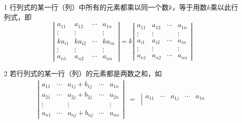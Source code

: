 \begin{xingzhi}[线性性质]
  \begin{itemize}
  \item[1] 行列式的某一行（列）中所有的元素都乘以同一个数$k$，等于用数$k$乘以此行列式，即
    \begin{equation}\label{xz3-1}
      \left|
        \begin{array}{ccccc}
          a_{11}  & a_{12} & \cdots & a_{1n} \\
          \vdots & \vdots     &        & \vdots \\
          ka_{i1}  & ka_{i2} & \cdots & ka_{in} \\
          \vdots & \vdots     &        & \vdots \\
          a_{n1}  & a_{n2} & \cdots & a_{nn}
        \end{array}
      \right| = k
      \left|
        \begin{array}{ccccc}
          a_{11}  & a_{12} & \cdots & a_{1n} \\
          \vdots & \vdots     &        & \vdots \\
          a_{i1}  & a_{i2} & \cdots & a_{in} \\
          \vdots & \vdots     &        & \vdots \\
          a_{n1}  & a_{n2} & \cdots & a_{nn}
        \end{array}
      \right|
    \end{equation}
  \item[2] 若行列式的某一行（列）的元素都是两数之和，如       \begin{equation}\label{xz3-2}
      \begin{array}{rcl}
        \left|
        \begin{array}{ccccc}
          a_{11} & \cdots & a_{1j}+b_{1j} & \cdots & a_{1n} \\
          a_{21} & \cdots & a_{2j}+b_{2j} & \cdots & a_{2n} \\
          \vdots&        & \vdots      &        & \vdots \\
          a_{n1} & \cdots & a_{nj}+b_{nj} & \cdots & a_{nn}
        \end{array}
                                                     \right| & = & \left|
                                                                   \begin{array}{ccccc}
                                                                     a_{11} & \cdots & a_{1j} & \cdots & a_{1n} \\

\end{array}
\end{array}
\end{equation}
\end{itemize}
\end{xingzhi}
